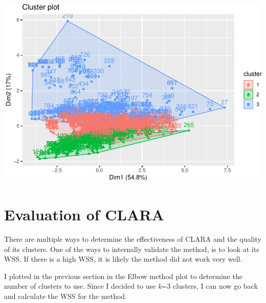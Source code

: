 \documentclass[12pt,twoside]{amherstthesis}
\begin{document}
  \begin{center}\includegraphics{Comps_Proj_files/figure-latex/unnamed-chunk-10-1} \end{center}
  
  \section{Evaluation of CLARA}\label{evaluation-of-clara}
  
  There are multiple ways to determine the effectiveness of CLARA and the
  quality of its clusters. One of the ways to internally validate the
  method, is to look at its WSS. If there is a high WSS, it is likely the
  method did not work very well.
  
  I plotted in the previous section in the Elbow method plot to determine
  the number of clusters to use. Since I decided to use \emph{k}=3
  clusters, I can now go back and calculate the WSS for the method.
  
  \begin{Shaded}
  \begin{Highlighting}[]
  \StringTok{ } \NormalTok{) }\OperatorTok{+}
  \StringTok{    }\NormalTok{(} \NormalTok{, } \NormalTok{)}\OperatorTok{+}
  \StringTok{  }\NormalTok{(} \NormalTok{)}
  \end{Highlighting}
  \end{Shaded}
  
\end{document}
